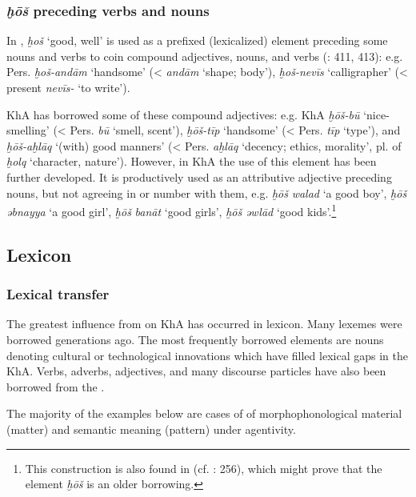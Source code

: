 \documentclass[output=paper,nonflat]{langsci/langscibook}
\begin{document}
\subsubsection{\textit{ḫōš} preceding verbs and nouns} \label{xosh}

In , \textit{ḫoš} ‘good, well’ is used as a prefixed (lexicalized) element preceding some nouns and verbs to coin compound adjectives, nouns, and verbs (\citealt{Majidi1990}: 411, 413): e.g. Pers. \textit{ḫoš-andām} ‘handsome’ (< \textit{andām} ‘shape; body’), \textit{ḫoš-nevīs} ‘calligrapher’ (< present  \textit{nevīs-} ‘to write’).

KhA has borrowed some of these  compound adjectives: e.g. KhA \textit{ḫōš-bū} ‘nice-smelling’ (< Pers. \textit{bū} ‘smell, scent’), \textit{ḫōš-tīp} ‘handsome’ (< Pers. \textit{tīp} ‘type’), and \textit{ḫōš-aḫlāq} ‘(with) good manners’ (< Pers. \textit{aḫlāq} ‘decency; ethics, morality’, pl. of \textit{ḫolq} ‘character, nature’). However, in KhA the use of this element has been further developed. It is productively used as an attributive adjective preceding nouns, but not agreeing in  or number with them, e.g. \textit{ḫōš} \textit{walad} ‘a good boy’, \textit{ḫōš} \textit{əbnayya} ‘a good girl’, \textit{ḫōš} \textit{banāt} ‘good girls’, \textit{ḫōš} \textit{əwlād} ‘good kids’.\footnote{This construction is also found in   (cf. \citealt{Erwin1963}: 256), which might prove that the element \textit{ḫōš} is an older borrowing.}



\subsection{Lexicon}
\subsubsection{Lexical transfer}

The greatest influence from  on KhA has occurred in lexicon. Many  lexemes were borrowed generations ago. The most frequently borrowed elements are nouns denoting cultural or technological innovations which have filled lexical gaps in the  KhA. Verbs, adverbs, adjectives, and many discourse particles have also been borrowed from the  .

The majority of the examples below are cases of  of morphophonological material (matter) and semantic meaning (pattern) under  agentivity. 
\end{document}
